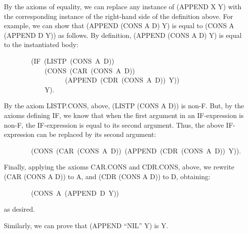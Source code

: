 \documentclass[11pt]{book}
\newenvironment{pubasis}{\begin{flushleft}\ttfamily\small}{\normalsize\rmfamily\end{flushleft}}
\begin{document}
By the axioms of equality, we can replace any instance of (APPEND X Y)
with the corresponding instance of the right-hand side of the definition
above.  For example, we can show that (APPEND (CONS A D) Y)
is equal to (CONS A (APPEND D Y)) as follows.  By
definition, (APPEND (CONS A D) Y) is equal to the instantiated body:
\begin{pubasis}
~~~~~~~~(IF~(LISTP~(CONS~A~D))\\
~~~~~~~~~~~~(CONS~(CAR~(CONS~A~D))\\
~~~~~~~~~~~~~~~~~~(APPEND~(CDR~(CONS~A~D))~Y))\\
~~~~~~~~~~~~Y).\\
\end{pubasis}
By the axiom LISTP.CONS, above, (LISTP (CONS A D)) is non-F.
But, by the axioms defining IF, we know
that when the first argument in an IF-expression is non-F, the IF-expression is
equal to its second argument.  Thus, the above IF-expression can be
replaced by its second argument:
\begin{pubasis}
~~~~~~~~(CONS~(CAR~(CONS~A~D))~(APPEND~(CDR~(CONS~A~D))~Y)).\\
\end{pubasis}
Finally, applying the axioms CAR.CONS and CDR.CONS, above, we
rewrite (CAR (CONS A D)) to A, and (CDR (CONS A D)) to D, obtaining:
\begin{pubasis}
~~~~~~~~(CONS~A~(APPEND~D~Y))\\
\end{pubasis}
as desired.

Similarly, we can prove that (APPEND ``NIL'' Y) is Y.
\end{document}
